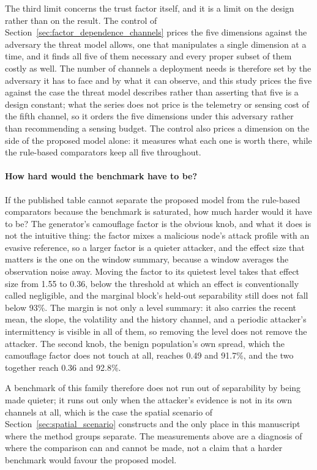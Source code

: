 \documentclass[notspecified,article,submit,moreauthors]{Definitions/mdpi}
\begin{document}
The third limit concerns the trust factor itself, and it is a limit on the design rather than on the result. The control of Section~\ref{sec:factor_dependence_channels} prices the five dimensions against the adversary the threat model allows, one that manipulates a single dimension at a time, and it finds all five of them necessary and every proper subset of them costly as well. The number of channels a deployment needs is therefore set by the adversary it has to face and by what it can observe, and this study prices the five against the case the threat model describes rather than asserting that five is a design constant; what the series does not price is the telemetry or sensing cost of the fifth channel, so it orders the five dimensions under this adversary rather than recommending a sensing budget. The control also prices a dimension on the side of the proposed model alone: it measures what each one is worth there, while the rule-based comparators keep all five throughout.

\paragraph{How hard would the benchmark have to be?}
If the published table cannot separate the proposed model from the rule-based comparators because the benchmark is saturated, how much harder would it have to be? The generator's camouflage factor is the obvious knob, and what it does is not the intuitive thing: the factor mixes a malicious node's attack profile with an evasive reference, so a larger factor is a quieter attacker, and the effect size that matters is the one on the window summary, because a window averages the observation noise away. Moving the factor to its quietest level takes that effect size from 1.55 to 0.36, below the threshold at which an effect is conventionally called negligible, and the marginal block's held-out separability still does not fall below 93\%. The margin is not only a level summary: it also carries the recent mean, the slope, the volatility and the history channel, and a periodic attacker's intermittency is visible in all of them, so removing the level does not remove the attacker. The second knob, the benign population's own spread, which the camouflage factor does not touch at all, reaches 0.49 and 91.7\%, and the two together reach 0.36 and 92.8\%.

A benchmark of this family therefore does not run out of separability by being made quieter; it runs out only when the attacker's evidence is not in its own channels at all, which is the case the spatial scenario of Section~\ref{sec:spatial_scenario} constructs and the only place in this manuscript where the method groups separate. The measurements above are a diagnosis of where the comparison can and cannot be made, not a claim that a harder benchmark would favour the proposed model.
\end{document}
